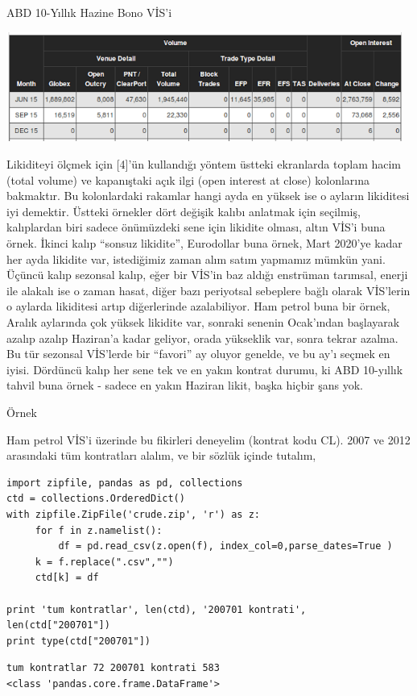 \documentclass[12pt,fleqn]{article}\usepackage{../../common}
\begin{document}
ABD 10-Yıllık Hazine Bono VİS'i

\includegraphics[width=13cm]{case_4.png}

Likiditeyi ölçmek için [4]'ün kullandığı yöntem üstteki ekranlarda toplam hacim
(total volume) ve kapanıştaki açık ilgi (open interest at close) kolonlarına
bakmaktır. Bu kolonlardaki rakamlar hangi ayda en yüksek ise o ayların
likiditesi iyi demektir. Üstteki örnekler dört değişik kalıbı anlatmak için
seçilmiş, kalıplardan biri sadece önümüzdeki sene için likidite olması, altın
VİS'i buna örnek. İkinci kalıp ``sonsuz likidite'', Eurodollar buna örnek, Mart
2020'ye kadar her ayda likidite var, istediğimiz zaman alım satım yapmamız
mümkün yani. Üçüncü kalıp sezonsal kalıp, eğer bir VİS'in baz aldığı enstrüman
tarımsal, enerji ile alakalı ise o zaman hasat, diğer bazı periyotsal sebeplere
bağlı olarak VİS'lerin o aylarda likiditesi artıp diğerlerinde azalabiliyor. Ham
petrol buna bir örnek, Aralık aylarında çok yüksek likidite var, sonraki senenin
Ocak'ından başlayarak azalıp azalıp Haziran'a kadar geliyor, orada yükseklik
var, sonra tekrar azalma. Bu tür sezonsal VİS'lerde bir ``favori'' ay oluyor
genelde, ve bu ay'ı seçmek en iyisi. Dördüncü kalıp her sene tek ve en yakın
kontrat durumu, ki ABD 10-yıllık tahvil buna örnek - sadece en yakın Haziran
likit, başka hiçbir şans yok.

Örnek

Ham petrol VİS'i üzerinde bu fikirleri deneyelim (kontrat kodu CL). 2007 ve 2012
arasındaki tüm kontratları alalım, ve bir sözlük içinde tutalım,

\begin{verbatim}
import zipfile, pandas as pd, collections
ctd = collections.OrderedDict()
with zipfile.ZipFile('crude.zip', 'r') as z:
     for f in z.namelist():
     	 df = pd.read_csv(z.open(f), index_col=0,parse_dates=True )
	 k = f.replace(".csv","")
	 ctd[k] = df
         
print 'tum kontratlar', len(ctd), '200701 kontrati', len(ctd["200701"])
print type(ctd["200701"])
\end{verbatim}

\begin{verbatim}
tum kontratlar 72 200701 kontrati 583
<class 'pandas.core.frame.DataFrame'>
\end{verbatim}
\end{document}
